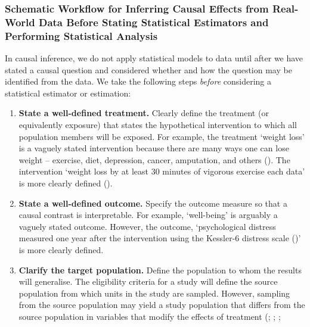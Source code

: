 \documentclass[
  single column]{article}
\begin{document}
\subsubsection{Schematic Workflow for Inferring Causal Effects from
Real-World Data Before Stating Statistical Estimators and Performing
Statistical
Analysis}\label{schematic-workflow-for-inferring-causal-effects-from-real-world-data-before-stating-statistical-estimators-and-performing-statistical-analysis}

In causal inference, we do not apply statistical models to data until
after we have stated a causal question and considered whether and how
the question may be identified from the data. We take the following
steps \emph{before} considering a statistical estimator or estimation:

\begin{enumerate}
\def\labelenumi{\arabic{enumi}.}
\item
  \textbf{State a well-defined treatment.} Clearly define the treatment
  (or equivalently exposure) that states the hypothetical intervention
  to which all population members will be exposed. For example, the
  treatment `weight loss' is a vaguely stated intervention because there
  are many ways one can lose weight -- exercise, diet, depression,
  cancer, amputation, and others (). The intervention `weight loss by at least 30
  minutes of vigorous exercise each data' is more clearly defined
  ().
\item
  \textbf{State a well-defined outcome.} Specify the outcome measure so
  that a causal contrast is interpretable. For example, `well-being' is
  arguably a vaguely stated outcome. However, the outcome,
  `psychological distress measured one year after the intervention using
  the Kessler-6 distress scale ()' is more clearly defined.
\item
  \textbf{Clarify the target population.} Define the population to whom
  the results will generalise. The eligibility criteria for a study will
  define the source population from which units in the study are
  sampled. However, sampling from the source population may yield a
  study population that differs from the source population in variables
  that modify the effects of treatment
  (;
  ;
  ;

\end{enumerate}
\end{document}
